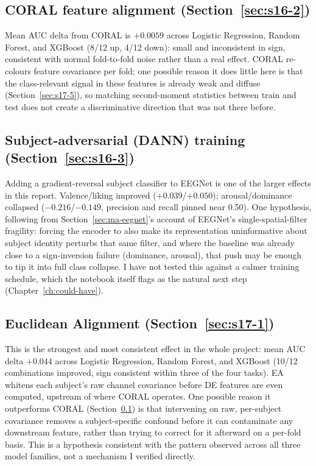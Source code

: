 \documentclass[11pt]{report}
\begin{document}
\subsection{CORAL feature alignment (Section~\ref{sec:s16-2})}
\label{sec:ma-beyond-coral}
Mean AUC delta from CORAL is $+0.0059$ across Logistic Regression, Random
Forest, and XGBoost (8/12 up, 4/12 down): small and inconsistent in sign,
consistent with normal fold-to-fold noise rather than a real effect. CORAL
re-colours feature covariance per fold; one possible reason it does little
here is that the class-relevant signal in these features is already weak
and diffuse (Section~\ref{sec:s17-5}), so matching second-moment statistics
between train and test does not create a discriminative direction that
was not there before.

\subsection{Subject-adversarial (DANN) training (Section~\ref{sec:s16-3})}
\label{sec:ma-beyond-dann}
Adding a gradient-reversal subject classifier to EEGNet is one of the
larger effects in this report. Valence/liking improved ($+0.039$/$+0.050$);
arousal/dominance collapsed ($-0.216$/$-0.149$, precision and recall pinned
near 0.50). One hypothesis, following from Section~\ref{sec:ma-eegnet}'s
account of EEGNet's single-spatial-filter fragility: forcing the encoder to
also make its representation uninformative about subject identity perturbs
that same filter, and where the baseline was already close to a
sign-inversion failure (dominance, arousal), that push may be enough to
tip it into full class collapse. I have not tested this against a
calmer training schedule, which the notebook itself flags as the natural
next step (Chapter~\ref{ch:could-have}).

\subsection{Euclidean Alignment (Section~\ref{sec:s17-1})}
\label{sec:ma-beyond-ea}
This is the strongest and most consistent effect in the whole project: mean
AUC delta $+0.044$ across Logistic Regression, Random Forest, and XGBoost
(10/12 combinations improved, sign consistent within three of the four
tasks). EA whitens each subject's raw channel covariance before DE features
are even computed, upstream of where CORAL operates. One possible reason it
outperforms CORAL (Section~\ref{sec:ma-beyond-coral}) is that intervening
on raw, per-subject covariance removes a subject-specific confound before
it can contaminate any downstream feature, rather than trying to correct
for it afterward on a per-fold basis. This is a hypothesis consistent with
the pattern observed across all three model families, not a mechanism I
verified directly.
\end{document}

